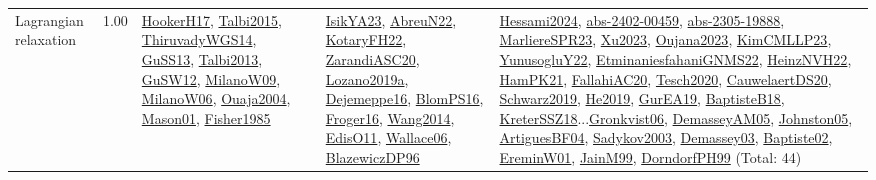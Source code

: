 {\begin{longtable}{p{3cm}r>{\raggedright\arraybackslash}p{6cm}>{\raggedright\arraybackslash}p{6cm}>{\raggedright\arraybackslash}p{8cm}}
\index{Lagrangian relaxation}\index{Algorithms!Lagrangian relaxation}Lagrangian relaxation &  1.00 & \hyperref[detail:HookerH17]{HookerH17}, \hyperref[detail:Talbi2015]{Talbi2015}, \hyperref[detail:ThiruvadyWGS14]{ThiruvadyWGS14}, \hyperref[detail:GuSS13]{GuSS13}, \hyperref[detail:Talbi2013]{Talbi2013}, \hyperref[detail:GuSW12]{GuSW12}, \hyperref[detail:MilanoW09]{MilanoW09}, \hyperref[detail:MilanoW06]{MilanoW06}, \hyperref[detail:Ouaja2004]{Ouaja2004}, \hyperref[detail:Mason01]{Mason01}, \hyperref[detail:Fisher1985]{Fisher1985} & \hyperref[detail:IsikYA23]{IsikYA23}, \hyperref[detail:AbreuN22]{AbreuN22}, \hyperref[detail:KotaryFH22]{KotaryFH22}, \hyperref[detail:ZarandiASC20]{ZarandiASC20}, \hyperref[detail:Lozano2019a]{Lozano2019a}, \hyperref[detail:Dejemeppe16]{Dejemeppe16}, \hyperref[detail:BlomPS16]{BlomPS16}, \hyperref[detail:Froger16]{Froger16}, \hyperref[detail:Wang2014]{Wang2014}, \hyperref[detail:EdisO11]{EdisO11}, \hyperref[detail:Wallace06]{Wallace06}, \hyperref[detail:BlazewiczDP96]{BlazewiczDP96} & \hyperref[detail:Hessami2024]{Hessami2024}, \hyperref[detail:abs-2402-00459]{abs-2402-00459}, \hyperref[detail:abs-2305-19888]{abs-2305-19888}, \hyperref[detail:MarliereSPR23]{MarliereSPR23}, \hyperref[detail:Xu2023]{Xu2023}, \hyperref[detail:Oujana2023]{Oujana2023}, \hyperref[detail:KimCMLLP23]{KimCMLLP23}, \hyperref[detail:YunusogluY22]{YunusogluY22}, \hyperref[detail:EtminaniesfahaniGNMS22]{EtminaniesfahaniGNMS22}, \hyperref[detail:HeinzNVH22]{HeinzNVH22}, \hyperref[detail:HamPK21]{HamPK21}, \hyperref[detail:FallahiAC20]{FallahiAC20}, \hyperref[detail:Tesch2020]{Tesch2020}, \hyperref[detail:CauwelaertDS20]{CauwelaertDS20}, \hyperref[detail:Schwarz2019]{Schwarz2019}, \hyperref[detail:He2019]{He2019}, \hyperref[detail:GurEA19]{GurEA19}, \hyperref[detail:BaptisteB18]{BaptisteB18}, \hyperref[detail:KreterSSZ18]{KreterSSZ18}...\hyperref[detail:Gronkvist06]{Gronkvist06}, \hyperref[detail:DemasseyAM05]{DemasseyAM05}, \hyperref[detail:Johnston05]{Johnston05}, \hyperref[detail:ArtiguesBF04]{ArtiguesBF04}, \hyperref[detail:Sadykov2003]{Sadykov2003}, \hyperref[detail:Demassey03]{Demassey03}, \hyperref[detail:Baptiste02]{Baptiste02}, \hyperref[detail:EreminW01]{EreminW01}, \hyperref[detail:JainM99]{JainM99}, \hyperref[detail:DorndorfPH99]{DorndorfPH99} (Total: 44)\\

\end{longtable}}
